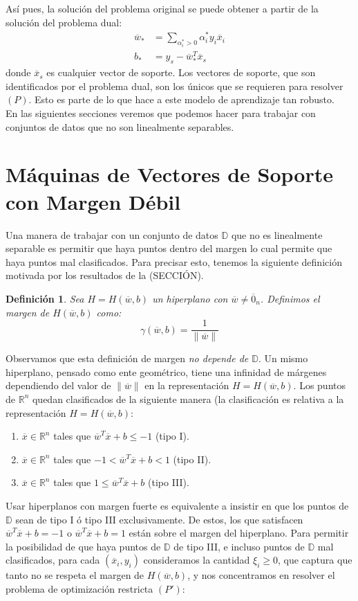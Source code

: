 \documentclass[11pt]{article}
\newtheorem{definition}{Definición}[section]
\newcommand{\R}{\mathbb{R}}
\newcommand{\Rn}{\R^{n}}
\newcommand{\wv}{\overline{w}}
\newcommand{\x}{\overline{x}}
\newcommand{\z}{\overline{0}_{n}}
\newcommand{\bo}{b_{*}}
\newcommand{\wo}{\wv_{*}}
\newcommand{\alio}{\alpha_{i}^{*}}
\newcommand{\Dat}{\mathbb{D}}
\newcommand{\nw}{\|\wv\|}
\begin{document}
Así pues, la solución del problema original se puede obtener a partir de la solución del problema dual:
\begin{equation*}
\begin{aligned}
\wo&=\sum_{\alio>0}\alio y_{i}\x_{i}\\
\bo&=y_{s}-\wo^{T}\x_{s}
\end{aligned}
\end{equation*}
donde $\x_{s}$ es cualquier vector de soporte. Los vectores de soporte, que son identificados por el problema dual, son los únicos que se requieren para resolver $(P)$. Esto es parte de lo que hace a este modelo de aprendizaje tan robusto.\\

En las siguientes secciones veremos que podemos hacer para trabajar con conjuntos de datos que no son linealmente separables.

\section{Máquinas de Vectores de Soporte con Margen Débil}
Una manera de trabajar con un conjunto de datos $\Dat$ que no es linealmente separable es permitir que haya puntos dentro del margen lo cual permite que haya puntos mal clasificados. Para precisar esto, tenemos la siguiente definición motivada por los resultados de la (SECCIÓN).

\begin{definition}
Sea $H=H(\wv, b)$ un hiperplano con $\wv\ne\z$. Definimos el margen de $H(\wv, b)$ como:
$$\gamma (\wv, b)=\frac{1}{\nw}$$
\end{definition}

Observamos que esta definición de margen \emph{no depende de $\Dat$}. Un mismo hiperplano, pensado como ente geométrico, tiene una infinidad de márgenes dependiendo del valor de $\nw$ en la representación $H=H(\wv, b)$. Los puntos de $\Rn$ quedan clasificados de la siguiente manera (la clasificación es relativa a la representación $H=H(\wv, b)$:
\begin{enumerate}
\item $\x\in\Rn$ tales que $\wv^{T}\x+b\leq -1$ (tipo I).
\item $\x\in\Rn$ tales que $-1<\wv^{T}\x+b<1$ (tipo II).
\item $\x\in\Rn$ tales que $1\leq\wv^{T}\x+b$ (tipo III).
\end{enumerate}

Usar hiperplanos con margen fuerte es equivalente a insistir en que los puntos de $\Dat$ sean de tipo I ó tipo III exclusivamente. De estos, los que satisfacen $\wv^{T}\x+b=-1$ o $\wv^{T}\x+b=1$ están sobre el margen del hiperplano. Para permitir la posibilidad de que haya puntos de $\Dat$ de tipo III, e incluso puntos de $\Dat$ mal clasificados, para cada $(\x_{i}, y_{i})$ consideramos la cantidad $\xi_{i}\geq0$, que captura que tanto no se respeta el margen de $H(\wv, b)$, y nos concentramos en resolver el problema de optimización restricta $(P')$:
\end{document}

